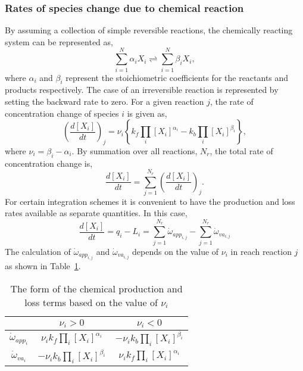 \subsubsection{Rates of species change due to chemical reaction}
\label{subsec:chem_rates}
By assuming a collection of simple reversible reactions, the chemically reacting system
can be represented as,
\begin{equation}
   \sum_{i=1}^N \alpha_i X_i \rightleftharpoons \sum_{i=1}^N \beta_i X_i,
\end{equation}
where $\alpha_i$ and $\beta_i$ represent the stoichiometric coefficients for the reactants and
products respectively.
The case of an irreversible reaction is represented by setting the backward rate to zero.
For a given reaction $j$, the rate of concentration change of species $i$ is given as,
\begin{equation}
  \left( \frac{d[X_i]}{dt} \right)_j = \nu_i \left\{ k_f \prod_i [X_i]^{\alpha_i} 
                       - k_b \prod_i [X_i]^{\beta_i} \right\},
\end{equation}
where $\nu_i = \beta_i - \alpha_i$.
By summation over all reactions, $N_r$, the total rate of concentration change is,
\begin{equation}
\label{eqn:chem_ode_system}
  \frac{d[X_i]}{dt} = \sum_{j=1}^{N_r} \left( \frac{d[X_i]}{dt} \right)_j.
\end{equation}
For certain integration schemes it is convenient to have the production and loss
rates available as separate quantities.
In this case,
\begin{equation}
\label{eq:split}
  \frac{d[X_i]}{dt} = q_i - L_i = \sum_{j=1}^{N_r} \dot{\omega}_{app_{i,j}} - \sum_{j=1}^{N_r} \dot{\omega}_{va_{i,j}} 
\end{equation}
The calculation of $\dot{\omega}_{app_{i,j}}$ and $\dot{\omega}_{va_{i,j}}$ depends on the
value of $\nu_i$ in reach reaction $j$ as shown in Table~\ref{tab:omega}.

\begin{table}[ht]
\caption[Chemical production and loss terms]{The form of the chemical production and loss terms based on the value of $\nu_i$}
\label{tab:omega}
\begin{center}
\begin{tabular}{ccc}
\hline \hline
                           & $\nu_i > 0$                          & $\nu_i < 0$  \\ \hline
 $\dot{\omega}_{app_{i}}$  & $\nu_i k_f \prod_i [X_i]^{\alpha_i}$ & $-\nu_i k_b \prod_i [X_i]^{\beta_i}$ \\
 $\dot{\omega}_{va_{i}}$   & $-\nu_i k_b \prod_i [X_i]^{\beta_i}$ & $\nu_i k_f \prod_i [X_i]^{\alpha_i}$ \\ \hline \hline
\end{tabular}
\end{center}
\end{table}

